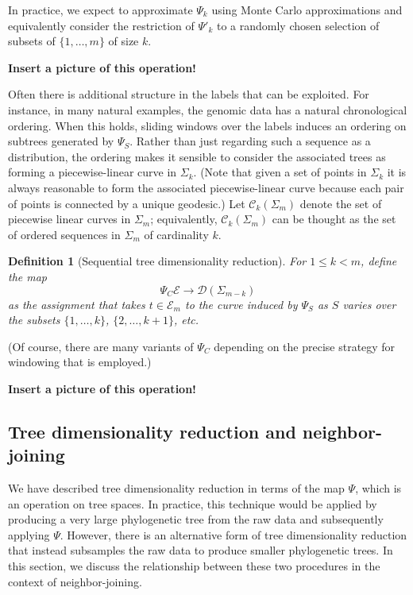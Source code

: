 \documentclass[a4paper,11pt]{article}
\newtheorem{definition}{Definition}
\newcommand{\aC}{\mathcal{C}}
\newcommand{\aD}{\mathcal{D}}
\newcommand{\aE}{\mathcal{E}}
\begin{document}
In practice, we expect to approximate $\Psi_k$ using Monte Carlo approximations and equivalently consider the restriction of $\Psi'_k$ to a randomly chosen selection of subsets of $\{1,\ldots,m\}$ of size $k$.

{\bf Insert a picture of this operation!}

Often there is additional structure in the labels that can be exploited.
For instance, in many natural examples, the genomic data has a natural chronological ordering.
When this holds, sliding windows over the labels induces an ordering on subtrees generated by $\Psi_S$.
Rather than just regarding such a sequence as a distribution, the ordering makes it sensible to consider the associated trees as forming a piecewise-linear curve in $\Sigma_k$.
(Note that given a set of points in $\Sigma_k$ it is always reasonable to form the associated piecewise-linear curve because each pair of points is connected by a unique geodesic.)
Let $\aC_k(\Sigma_m)$ denote the set of piecewise linear curves in $\Sigma_m$; equivalently, $\aC_k(\Sigma_m)$ can be thought as the set of ordered sequences in $\Sigma_m$ of cardinality $k$.

\begin{definition}[Sequential tree dimensionality reduction]
For $1 \leq k < m$, define the map
\[
\Psi_C \aE \to \aD(\Sigma_{m-k})
\]
as the assignment that takes $t \in \aE_m$ to the curve induced by $\Psi_S$ as $S$ varies over the subsets $\{1, \ldots, k\}$, $\{2, \ldots, k+1\}$, etc.
\end{definition}

(Of course, there are many variants of $\Psi_C$ depending on the precise strategy for windowing that is employed.)

{\bf Insert a picture of this operation!}

\subsection{Tree dimensionality reduction and neighbor-joining}

We have described tree dimensionality reduction in terms of the map $\Psi$, which is an operation on tree spaces.
In practice, this technique would be applied by producing a very large phylogenetic tree from the raw data and subsequently applying $\Psi$.
However, there is an alternative form of tree dimensionality reduction that instead subsamples the raw data to produce smaller phylogenetic trees.
In this section, we discuss the relationship between these two procedures in the context of neighbor-joining.
\end{document}
